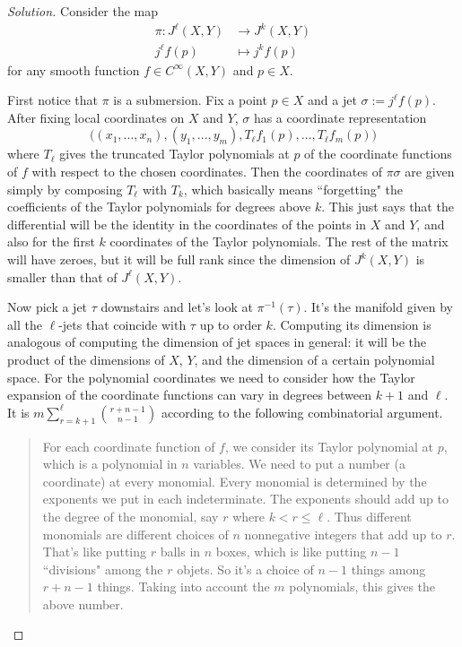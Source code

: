 \begin{proof}[Solution]\leavevmode
Consider the map
\begin{align*}
	\pi: J^\ell(X,Y) &\longrightarrow J^{k}(X,Y) \\
	j^\ell f(p) &\longmapsto j^k f(p)
\end{align*}
for any smooth function \(f \in C^\infty(X,Y)\) and \(p \in X\).

First notice that \(\pi\) is a submersion. Fix a point \(p \in X\) and a jet \(\sigma:= j^\ell f(p)\). After fixing local coordinates on \(X\) and \(Y\), \(\sigma\) has a coordinate representation 
\[\Big((x_1,\ldots,x_n), (y_1,\ldots,y_m),T_\ell f_1(p),\ldots,T_\ell f_m(p)\Big)\]
where \(T_\ell\) gives the truncated Taylor polynomials at \(p\) of the coordinate functions of \(f\) with respect to the chosen coordinates. Then the coordinates of \(\pi\sigma\) are given simply by composing \(T_\ell\) with \(T_k\), which basically means ``forgetting" the coefficients of the Taylor polynomials for degrees above \(k\). This just says that the differential will be the identity in the coordinates of the points in \(X\) and \(Y\), and also for the first \(k\) coordinates of the Taylor polynomials. The rest of the matrix will have zeroes, but it will be full rank since the dimension of \(J^k(X,Y)\) is smaller than that of  \(J^\ell(X,Y)\).

Now pick a jet \(\tau\) downstairs and let's look at \(\pi^{-1}(\tau)\). It's the manifold given by all the \(\ell\)-jets that coincide with \(\tau\) up to order \(k\). Computing its dimension is analogous of computing the dimension of jet spaces in general: it will be the product of the dimensions of \(X\), \(Y\), and the dimension of a certain polynomial space. For the polynomial coordinates we need to consider how the Taylor expansion of the coordinate functions can vary in degrees between  \(k+1\) and \(\ell\). It is \(m \sum_{r=k+1}^\ell \binom{r+n-1}{n-1}\) according to the following combinatorial argument.

\begin{quotation}
For each coordinate function of \(f\), we consider its Taylor polynomial at \(p\), which is a polynomial in  \(n\) variables. We need to put a number (a coordinate) at every monomial. Every monomial is determined by the exponents we put in each indeterminate. The exponents should add up to the degree of the monomial, say \(r\) where \(k<r\leq \ell\). Thus different monomials are different choices of \(n\) nonnegative integers that add up to \(r\). That's like putting \(r\) balls in \(n\) boxes, which is like putting \(n-1\) ``divisions" among the \(r\) objets. So it's a choice of \(n-1\) things among \(r+n-1\) things. Taking into account the \(m\) polynomials, this gives the above number.
\end{quotation}


\end{proof}
